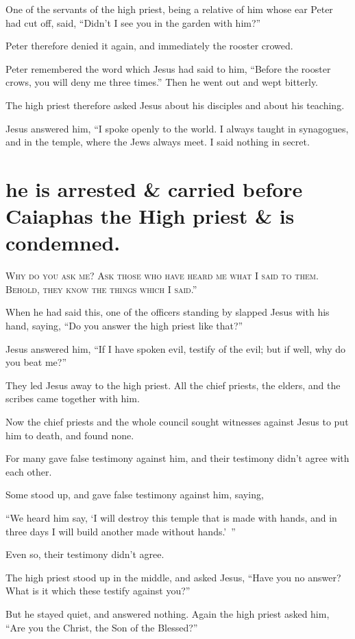 One of the servants of the high priest, being a relative of him whose ear Peter had cut off, said, “Didn’t I see you in the garden with him?”

Peter therefore denied it again, and immediately the rooster crowed.

Peter remembered the word which Jesus had said to him, “Before the rooster crows, you will deny me three times.” Then he went out and wept bitterly.

The high priest therefore asked Jesus about his disciples and about his teaching.

Jesus answered him, “I spoke openly to the world. I always taught in synagogues, and in the temple, where the Jews always meet. I said nothing in secret.


\clearpage \section*{he is arrested \& carried before Caiaphas the High priest \& is condemned.}

\lettrine{W}{hy do you ask me? Ask those who have heard me what I said to them. Behold, they know the things which I said.”}

When he had said this, one of the officers standing by slapped Jesus with his hand, saying, “Do you answer the high priest like that?”

Jesus answered him, “If I have spoken evil, testify of the evil; but if well, why do you beat me?”

They led Jesus away to the high priest. All the chief priests, the elders, and the scribes came together with him.

Now the chief priests and the whole council sought witnesses against Jesus to put him to death, and found none.

For many gave false testimony against him, and their testimony didn’t agree with each other.

Some stood up, and gave false testimony against him, saying,

“We heard him say, ‘I will destroy this temple that is made with hands, and in three days I will build another made without hands.’ ”

Even so, their testimony didn’t agree.

The high priest stood up in the middle, and asked Jesus, “Have you no answer? What is it which these testify against you?”

But he stayed quiet, and answered nothing. Again the high priest asked him, “Are you the Christ, the Son of the Blessed?”

